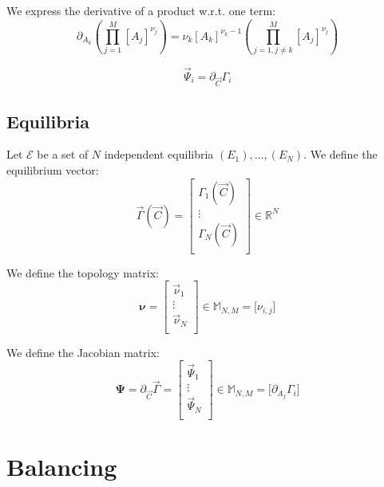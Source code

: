 \documentclass[aps,12pt]{revtex4}
\begin{document}
We express the derivative of a product w.r.t. one term:
\begin{equation}
	\partial_{A_k} \left( \prod_{j=1}^{M} [A_j]^{\nu_{j}} \right)  =
	\nu_k [A_k]^{\nu_k-1} \left( \prod_{j=1,j\not=k}^{M} [A_j]^{\nu_{j}} \right)
\end{equation}
 
\begin{equation}
	\vec{\Psi}_i = \partial_{\vec{C}} \Gamma_i
\end{equation}


\subsection{Equilibria}
Let $\mathcal{E}$ be a set of $N$ independent equilibria $(E_1),\dots,(E_N)$.
We define the equilibrium vector:
\begin{equation}
	\vec{\Gamma}(\vec{C}) =
	\begin{bmatrix}
	\Gamma_1(\vec{C})\\
	\vdots\\
	\Gamma_N(\vec{C})\\
	\end{bmatrix}
	\in \mathbb{R}^N
\end{equation}

We define the topology matrix:
\begin{equation}
	\bm{\nu} = 
	\begin{bmatrix}
	\vec{\nu}_1\\
	\vdots\\
	\vec{\nu}_N\\
	\end{bmatrix}
	\in \mathbb{M}_{N,M}
	= \lbrack \nu_{i,j} \rbrack
\end{equation}


We define the Jacobian matrix:
\begin{equation}
\bm{\Psi} = \partial_{\vec{C}} \vec{\Gamma} = 
\begin{bmatrix}
	\vec{\Psi}_1\\
	\vdots\\
	\vec{\Psi}_N\\
	\end{bmatrix}
	\in \mathbb{M}_{N,M} = 
	\lbrack \partial_{A_j}\Gamma_i \rbrack
\end{equation}

\section{Balancing}
\end{document}
